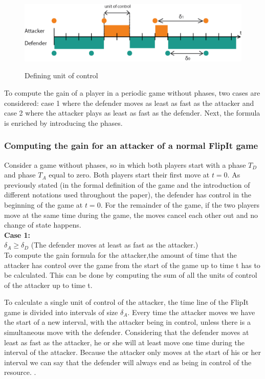 \begin{figure}[hbtp]
\caption{Defining unit of control}
\centering
\includegraphics[scale=1]{Images/FlipSpel.png}
\label{fig:notations}
\end{figure}

To compute the gain of a player in a periodic game without phases, two cases are considered: case 1 where the defender moves as least as fast as the attacker and case 2 where the attacker plays as least as fast as the defender.  Next, the formula is enriched by introducing the phases.

\subsubsection{Computing the gain for an attacker of a normal FlipIt game}
Consider a game without phases, so in which both players start with a phase $T_{D}$ and phase $T_{A}$ equal to zero. Both players start their first move at $t=0$. As previously stated (in the formal definition of the game and the introduction of different notations used throughout the paper), the defender has control in the beginning of the game at $t=0$. For the remainder of the game, if the two players move at the same time during the game, the moves cancel each other out and no change of state happens. \\

\textbf{Case  1:} \\
$\delta_{A} \geq \delta_{D}$ (The defender moves at least as fast as the attacker.) \\



To compute the gain formula for the attacker,the amount of time that the attacker has control over the game from the start of the game up to time t has to be calculated. This can be done by computing the sum of all the units of control of the attacker up to time t. 


To calculate a single unit of control of the attacker, the time line of the FlipIt game is divided into intervals of size $\delta_{A}$. Every time the attacker moves we have the start of a new interval, with the attacker being in control, unless there is a simultaneous move with the defender. 
Considering that the defender moves at least as fast as the attacker, he or she will at least move one time during the interval of the attacker. Because the attacker only moves at the start of his or her interval we can say that the defender will always end as being in control of the resource. 
. \\


